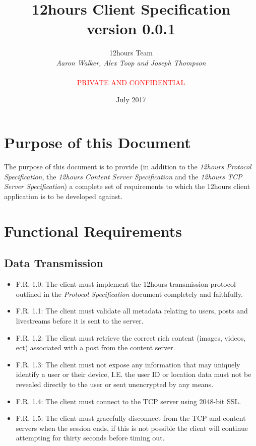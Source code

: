 \documentclass[12pt, a4paper]{article}
\begin{document}
\title{\textbf{12hours Client Specification \\ version 0.0.1}}
\author{12hours Team \\ \textit{Aaron Walker, Alex Toop and Joseph Thompson} \\ \\ \textcolor{red}{PRIVATE AND CONFIDENTIAL}}
\date{July 2017}
\maketitle

\tableofcontents
\clearpage

\section{Purpose of this Document}
The purpose of this document is to provide (in addition to the \textit{12hours Protocol Specification}, the \textit{12hours Content Server Specification} and the \textit{12hours TCP Server Specification}) a complete set of requirements to which the 12hours client application is to be developed against.

\section{Functional Requirements}
\subsection{Data Transmission}
\begin{itemize}
\item F.R. 1.0: The client must implement the 12hours transmission protocol outlined in the \textit{Protocol Specification} document completely and faithfully.
\item F.R. 1.1: The client must validate all metadata relating to users, posts and livestreams before it is sent to the server.
\item F.R. 1.2: The client must retrieve the correct rich content (images, videos, ect) associated with a post from the content server.
\item F.R. 1.3: The client must not expose any information that may uniquely identify a user or their device, I.E. the user ID or location data must not be revealed directly to the user or sent unencrypted by any means.
\item F.R. 1.4: The client must connect to the TCP server using 2048-bit SSL.
\item F.R. 1.5: The client must gracefully disconnect from the TCP and content servers when the session ends, if this is not possible the client will continue attempting for thirty seconds before timing out.
\end{itemize}
\end{document}
